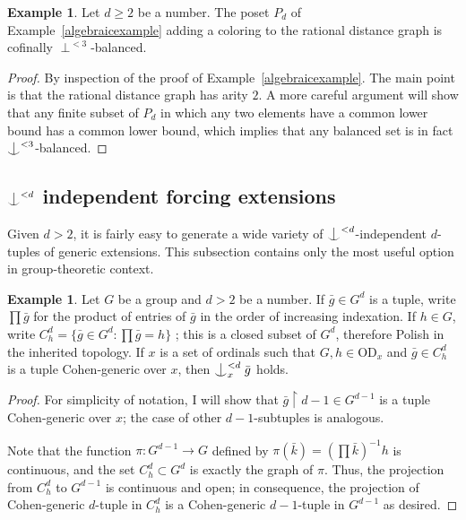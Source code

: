 \documentclass{article}
\newcommand{\vd}{\mathrm{OD}}
\newcommand{\forkindep}[1][]{%
  \mathrel{
    \mathop{
      \vcenter{
        \hbox{\oalign{\noalign{\kern-.3ex}\hfil$\vert$\hfil\cr
              \noalign{\kern-.7ex}
              $\smile$\cr\noalign{\kern-.3ex}}}
      }
    }\displaylimits_{#1}
  }
}
\theoremstyle{definition}
\newtheorem{example}[theorem]{Example}
\begin{document}
\begin{example}
Let $d\geq 2$ be a number. The poset $P_d$ of Example~\ref{algebraicexample} adding a coloring to the rational distance graph is cofinally $\perp^{<3}$-balanced.
\end{example}

\begin{proof}
By inspection of the proof of Example~\ref{algebraicexample}. The main point is that the rational distance graph has arity $2$. A more careful argument will show that any finite subset of $P_d$ in which any two elements have a common lower bound has a common lower bound, which implies that any balanced set is in fact $\forkindep^{<3}$-balanced.
\end{proof}

\subsection{$\forkindep^{<d}$ independent forcing extensions}

Given $d>2$, it is fairly easy to generate a wide variety of $\forkindep^{<d}$-independent $d$-tuples of generic extensions. This subsection contains only the most useful option in group-theoretic context.

\begin{example}
\label{groupexample}
Let $G$ be a group and $d>2$ be a number. If $\bar g\in G^d$ is a tuple, write $\prod\bar g$ for the product of entries of $\bar g$ in the order of increasing indexation. If $h\in G$, write $C^d_h=\{\bar g\in G^d\colon\prod\bar g=h\}$ ; this is a closed subset of $G^d$, therefore Polish in the inherited topology. If $x$ is a set of ordinals such that $G, h\in\vd_x$ and $\bar g\in C^d_h$ is a tuple Cohen-generic over $x$, then $\forkindep_x^{<d}\bar g$ holds.
\end{example}

\begin{proof}
For simplicity of notation, I will show that $\bar g\restriction d-1\in G^{d-1}$ is a tuple Cohen-generic over $x$; the case of other $d-1$-subtuples is analogous. 

Note that the function $\pi\colon G^{d-1}\to G$ defined by $\pi(\bar k)=(\prod\bar k)^{-1}h$ is continuous, and the set $C^d_h\subset G^d$ is exactly the graph of $\pi$. Thus, the projection from $C^d_h$ to $G^{d-1}$ is continuous and open; in consequence, the projection of Cohen-generic $d$-tuple in $C^d_h$ is a Cohen-generic $d-1$-tuple in $G^{d-1}$ as desired.
\end{proof}
\end{document}
